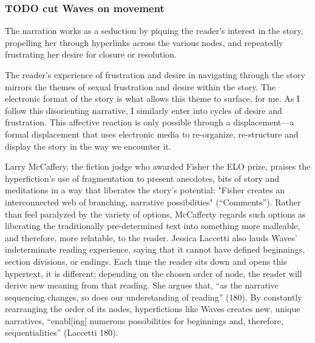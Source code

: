 \documentclass[11pt]{article}
\begin{document}
\subsubsection{{\bfseries\sffamily TODO} cut Waves on movement}
\label{sec:org2bb8774}
The narration works as a seduction by piquing the reader's interest in
the story, propelling her through hyperlinks across the various nodes,
and repeatedly frustrating her desire for closure or resolution.


The reader’s experience of frustration and desire in navigating
through the story mirrors the themes of sexual frustration and desire
within the story. The electronic format of the story is what allows
this theme to surface, for me. As I follow this disorienting
narrative, I similarly enter into cycles of desire and
frustration. This affective reaction is only possible through a
displacement---a formal displacement that uses electronic media to
re-organize, re-structure and display the story in the way we
encounter it.

Larry McCaffery, the fiction judge who awarded Fisher the ELO prize,
praises the hyperfiction’s use of fragmentation to present anecdotes,
bits of story and meditations in a way that liberates the story’s
potential: "Fisher creates an interconnected web of branching,
narrative possibilities" (“Comments”). Rather than feel paralyzed by
the variety of options, McCafferty regards such options as liberating
the traditionally pre-determined text into something more malleable,
and therefore, more relatable, to the reader. Jessica Laccetti also
lauds Waves’ indeterminate reading experience, saying that it cannot
have defined beginnings, section divisions, or endings. Each time the
reader sits down and opens this hypertext, it is different; depending
on the chosen order of node, the reader will derive new meaning from
that reading. She argues that, “as the narrative sequencing changes,
so does our understanding of reading” (180). By constantly rearranging
the order of its nodes, hyperfictions like Waves creates new, unique
narratives, “enabl[ing] numerous possibilities for beginnings and,
therefore, sequentialities” (Laccetti 180).
\end{document}

